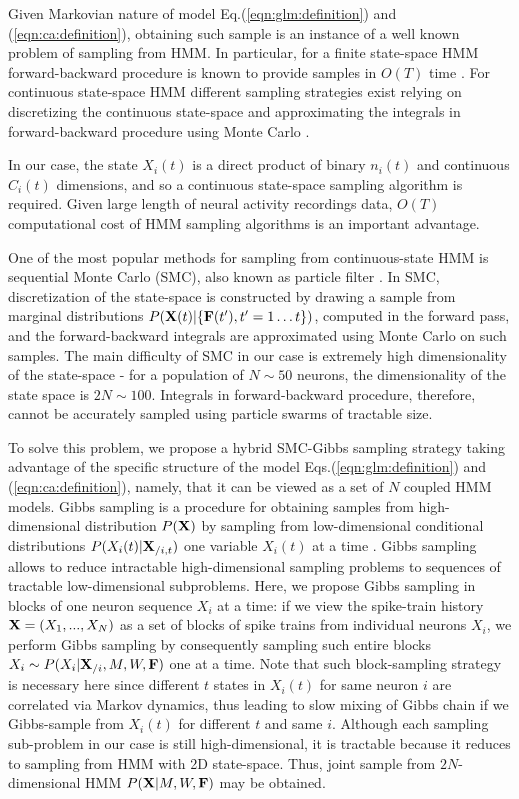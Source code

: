 \documentclass[amsmath,amssymb]{revtex4}
\begin{document}
Given Markovian nature of model Eq.(\ref{eqn:glm:definition}) and (\ref{eqn:ca:definition}), obtaining such sample is an instance of a well known problem of sampling from HMM. In particular, for a finite state-space HMM forward-backward procedure is known to provide samples in  $O(T)$ time \cite{RAB89}. For continuous state-space HMM different sampling strategies exist relying on discretizing the continuous state-space and approximating the integrals in forward-backward procedure using Monte Carlo \cite{DFG01,MINKAPHD,Fearnhead2003,koyama08,Andrieu2007,NBR03}.

In our case, the state $X_i(t)$ is a direct product of binary $n_i(t)$ and continuous $C_i(t)$ dimensions, and so a continuous state-space sampling algorithm is required.
Given large length of neural activity recordings data, $O(T)$ computational cost of HMM sampling algorithms is an important advantage.

One of the most popular methods for sampling from continuous-state HMM is sequential Monte Carlo (SMC), also known as particle filter \cite{DFG01}. In SMC, discretization of the state-space is constructed by drawing a sample from marginal distributions  $P({\bf X}(t)|\{{\bf F}(t'),t'=1\ldots t\})$, computed in the forward pass, and the forward-backward integrals are approximated using Monte Carlo on such samples. The main difficulty of SMC in our case is extremely high dimensionality of the state-space - for a population of $N\sim 50$ neurons, the dimensionality of the state space is $2N\sim 100$. Integrals in forward-backward procedure, therefore, cannot be accurately sampled using particle swarms of tractable size.

To solve this problem, we propose a hybrid SMC-Gibbs sampling strategy taking advantage of the specific structure of the model Eqs.(\ref{eqn:glm:definition}) and (\ref{eqn:ca:definition}), namely, that it can be viewed as a set of $N$ coupled HMM models. Gibbs sampling is a procedure for obtaining samples from high-dimensional distribution $P({\bf X})$ by sampling from low-dimensional conditional distributions $P(X_{i}(t)|{\bf X}_{/i,t})$ one variable $X_{i}(t)$ at a time \cite{Gelfand1990}.  Gibbs sampling allows to reduce intractable high-dimensional sampling problems to sequences of tractable low-dimensional subproblems.
Here, we propose Gibbs sampling in blocks of one neuron sequence $X_{i}$ at a time: if we view the spike-train history ${\bf X}=(X_1,...,X_N)$ as a set of blocks of spike trains from individual neurons $X_i$, we perform Gibbs sampling by consequently sampling such entire blocks $X_i\sim P(X_{i}|{\bf X}_{/i},M,W,{\bf F})$ one at a time.
Note that such block-sampling strategy is necessary here since different $t$ states in $X_i(t)$ for same neuron $i$ are correlated via Markov dynamics, thus leading to slow mixing of Gibbs chain if we Gibbs-sample from $X_i(t)$ for different $t$ and same $i$.
Although each sampling sub-problem in our case is still high-dimensional, it is tractable because it reduces to sampling from HMM with 2D state-space. Thus, joint sample from $2N$-dimensional HMM $P({\bf X}|M,W,{\bf F})$ may be obtained.
\end{document}
